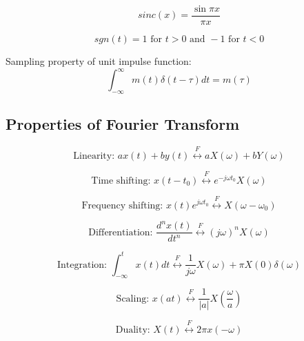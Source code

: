 \documentclass[a4paper]{article}
\begin{document}
\begin{displaymath}
sinc(x)=\frac{\sin \pi x}{\pi x}
\end{displaymath}

\begin{displaymath}
sgn(t)=1 \textrm{ for } t>0 \textrm{ and } -1 \textrm{ for } t<0
\end{displaymath}

Sampling property of unit impulse function:
\begin{displaymath}
\int_{-\infty}^{\infty} m(t) \delta (t-\tau) dt = m(\tau)
\end{displaymath}

\subsection{Properties of Fourier Transform}

\begin{displaymath}
\textrm{Linearity:  }
ax(t) + by(t)
\stackrel{F}{\longleftrightarrow}
aX(\omega) + bY(\omega)
\end{displaymath}

\begin{displaymath}
\textrm{Time shifting:  }
x(t-t_0)
\stackrel{F}{\longleftrightarrow}
e^{-j\omega t_0}X(\omega)
\end{displaymath}

\begin{displaymath}
\textrm{Frequency shifting:  }
x(t) e^{j\omega t_0}
\stackrel{F}{\longleftrightarrow}
X(\omega-\omega_0)
\end{displaymath}

\begin{displaymath}
\textrm{Differentiation:  }
\frac{d^nx(t)}{dt^n}
\stackrel{F}{\longleftrightarrow}
(j\omega)^nX(\omega)
\end{displaymath}

\begin{displaymath}
\textrm{Integration:  }
\int_{-\infty}^t x(t)dt
\stackrel{F}{\longleftrightarrow}
\frac{1}{j\omega}X(\omega) + \pi X(0)\delta(\omega)
\end{displaymath}

\begin{displaymath}
\textrm{Scaling:  }
x(at)
\stackrel{F}{\longleftrightarrow}
\frac{1}{|a|} X(\frac{\omega}{a})
\end{displaymath}

\begin{displaymath}
\textrm{Duality:  }
X(t)
\stackrel{F}{\longleftrightarrow}
2\pi x(-\omega)
\end{displaymath}
\end{document}
